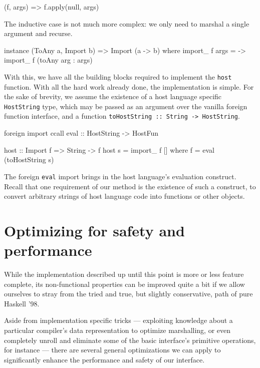 \documentclass[preprint]{sigplanconf}
\begin{document}
\begin{code}
  (f, args) => f.apply(null, args)
\end{code}

The inductive case is not much more complex: we only need to marshal a single
argument and recurse.

\begin{code}
  instance (ToAny a, Import b) =>
           Import (a -> b) where
    import_ f args =
      \arg -> import_ f (toAny arg : args)
\end{code}

With this, we have all the building blocks required to implement the
\lstinline!host! function. With all the hard work already done, the
implementation is simple. For the sake of brevity, we assume the
existence of a host language specific \lstinline!HostString! type, which may
be passed as an argument over the vanilla foreign function interface, and a
function \lstinline!toHostString :: String -> HostString!.

\begin{code}
  foreign import ccall
    eval :: HostString -> HostFun

  host :: Import f => String -> f
  host s = import_ f []
    where
      f = eval (toHostString s)
\end{code}

The foreign \lstinline!eval! import brings in the host language's evaluation
construct. Recall that one requirement of our method is the existence of such
a construct, to convert arbitrary strings of host language code into functions
or other objects.

\section{Optimizing for safety and performance}
\label{sec:optimizations}
While the implementation described up until this point is more or less
feature complete, its non-functional properties can be improved quite a bit
if we allow ourselves to stray from the tried and true, but slightly
conservative, path of pure Haskell '98.

Aside from implementation specific tricks --- exploiting knowledge about a
particular compiler's data representation to optimize marshalling, or even
completely unroll and eliminate some of the basic interface's primitive
operations, for instance --- there are several general optimizations we can
apply to significantly enhance the performance and safety of our interface.
\end{document}
